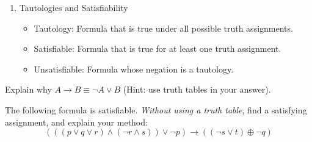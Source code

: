 \documentclass[solution, letterpaper]{cs20inclass}
\begin{document}
\begin{enumerate}
\item Tautologies and Satisfiability
  \begin{itemize}
    \item Tautology:  Formula that is true under all possible truth assignments.
    \item Satisfiable:  Formula that is true for at least one truth assignment.
    \item Unsatisfiable:  Formula whose negation is a tautology.
  \end{itemize}

\end{enumerate}
\pagebreak

\problem

\subproblem Explain why $A \rightarrow B \equiv \lnot A \lor B$ (Hint: use truth tables in your answer).

\subproblem The following formula is satisfiable.  \emph{Without using a truth table}, find a satisfying assignment, and explain your method:
	$$(((p \lor q \lor r) \land (\neg r \land s)) \lor \neg p) \rightarrow ((\neg s \lor t) \oplus \neg q) $$
\end{document}
